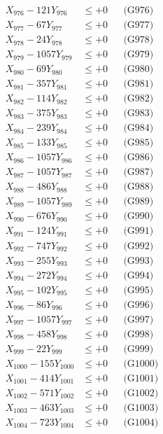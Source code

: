 \documentclass[a4paper,10pt]{article}
\begin{document}
{\begin{align}
X_{976} - 121Y_{976} &\leq +0 && \text{(G976)} \\
X_{977} - 67Y_{977} &\leq +0 && \text{(G977)} \\
X_{978} - 24Y_{978} &\leq +0 && \text{(G978)} \\
X_{979} - 1057Y_{979} &\leq +0 && \text{(G979)} \\
X_{980} - 69Y_{980} &\leq +0 && \text{(G980)} \\
\allowbreak
X_{981} - 357Y_{981} &\leq +0 && \text{(G981)} \\
X_{982} - 114Y_{982} &\leq +0 && \text{(G982)} \\
X_{983} - 375Y_{983} &\leq +0 && \text{(G983)} \\
X_{984} - 239Y_{984} &\leq +0 && \text{(G984)} \\
X_{985} - 133Y_{985} &\leq +0 && \text{(G985)} \\
X_{986} - 1057Y_{986} &\leq +0 && \text{(G986)} \\
X_{987} - 1057Y_{987} &\leq +0 && \text{(G987)} \\
X_{988} - 486Y_{988} &\leq +0 && \text{(G988)} \\
X_{989} - 1057Y_{989} &\leq +0 && \text{(G989)} \\
X_{990} - 676Y_{990} &\leq +0 && \text{(G990)} \\
\allowbreak
X_{991} - 124Y_{991} &\leq +0 && \text{(G991)} \\
X_{992} - 747Y_{992} &\leq +0 && \text{(G992)} \\
X_{993} - 255Y_{993} &\leq +0 && \text{(G993)} \\
X_{994} - 272Y_{994} &\leq +0 && \text{(G994)} \\
X_{995} - 102Y_{995} &\leq +0 && \text{(G995)} \\
X_{996} - 86Y_{996} &\leq +0 && \text{(G996)} \\
X_{997} - 1057Y_{997} &\leq +0 && \text{(G997)} \\
X_{998} - 458Y_{998} &\leq +0 && \text{(G998)} \\
X_{999} - 22Y_{999} &\leq +0 && \text{(G999)} \\
X_{1000} - 155Y_{1000} &\leq +0 && \text{(G1000)} \\
\allowbreak
X_{1001} - 414Y_{1001} &\leq +0 && \text{(G1001)} \\
X_{1002} - 571Y_{1002} &\leq +0 && \text{(G1002)} \\
X_{1003} - 463Y_{1003} &\leq +0 && \text{(G1003)} \\
X_{1004} - 723Y_{1004} &\leq +0 && \text{(G1004)} \\

\end{align}}
\end{document}
